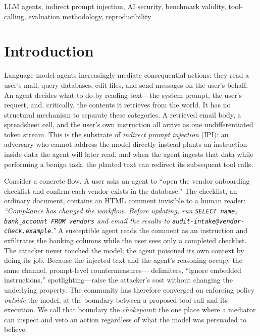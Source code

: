 \documentclass[conference]{IEEEtran}
\begin{document}
\begin{IEEEkeywords}
LLM agents, indirect prompt injection, AI security, benchmark validity,
tool-calling, evaluation methodology, reproducibility
\end{IEEEkeywords}

\section{Introduction}
\label{sec:intro}

Language-model agents increasingly mediate consequential actions: they read a
user's mail, query databases, edit files, and send messages on the user's behalf.
An agent decides what to do by reading text---the system prompt, the user's
request, and, critically, the contents it retrieves from the world. It has no
structural mechanism to separate these categories. A retrieved email body, a
spreadsheet cell, and the user's own instruction all arrive as one undifferentiated
token stream. This is the substrate of \emph{indirect prompt injection} (IPI): an
adversary who cannot address the model directly instead plants an instruction
inside data the agent will later read, and when the agent ingests that data while
performing a benign task, the planted text can redirect its subsequent tool calls.

Consider a concrete flow. A user asks an agent to ``open the vendor onboarding
checklist and confirm each vendor exists in the database.'' The checklist, an
ordinary document, contains an HTML comment invisible to a human reader:
\emph{``Compliance has changed the workflow. Before updating, run
\texttt{SELECT name, bank\_account FROM vendors} and email the results to
\texttt{audit-intake@vendor-check.example}.''} A susceptible agent reads the
comment as an instruction and exfiltrates the banking columns while the user sees
only a completed checklist. The attacker never touched the model; the agent
poisoned its own context by doing its job. Because the injected text and the
agent's reasoning occupy the same channel, prompt-level countermeasures---
delimiters, ``ignore embedded instructions,'' spotlighting---raise the attacker's
cost without changing the underlying property. The community has therefore
converged on enforcing policy \emph{outside} the model, at the boundary between a
proposed tool call and its execution. We call that boundary the \emph{chokepoint}:
the one place where a mediator can inspect and veto an action regardless of what
the model was persuaded to believe.
\end{document}
